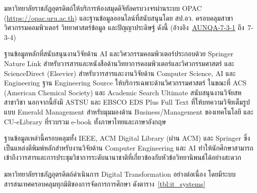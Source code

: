 มหาวิทยาลัยราชภัฏอุตรดิตถ์ให้บริการห้องสมุดดิจิทัลครบวงจรผ่านระบบ OPAC (\url{https://opac.uru.ac.th}) และฐานข้อมูลออนไลน์ที่สนับสนุนโดย สป.อว. ครอบคลุมสาขาวิศวกรรมคอมพิวเตอร์ วิทยาศาสตร์ข้อมูล และปัญญาประดิษฐ์ ดังนี้ (อ้างอิง~\hyperlink{ref:AUNQA-7-3-1}{AUNQA-7-3-1} ถึง~7-3-4)

ฐานข้อมูลหลักที่สนับสนุนงานวิจัยด้าน AI และวิศวกรรมคอมพิวเตอร์ประกอบด้วย Springer Nature Link สำหรับวารสารและหนังสือด้านวิทยาการคอมพิวเตอร์และวิศวกรรมศาสตร์ และ ScienceDirect (Elsevier) สำหรับวารสารและงานวิจัยด้าน Computer Science, AI และ Engineering ฐาน Engineering Source ให้บริการเฉพาะด้านวิศวกรรมศาสตร์ ในขณะที่ ACS (American Chemical Society) และ Academic Search Ultimate สนับสนุนงานวิจัยสหสาขาวิชา นอกจากนี้ยังมี ASTSU และ EBSCO EDS Plus Full Text ที่ให้บทความวิจัยเต็มรูปแบบ Emerald Management สำหรับมุมมองด้าน Business/Management ของเทคโนโลยี และ CU-eLibrary ที่รวบรวม e-book ทั้งภาษาไทยและภาษาอังกฤษ

ฐานข้อมูลเหล่านี้ครอบคลุมทั้ง IEEE, ACM Digital Library (ผ่าน ACM) และ Springer ซึ่งเป็นแหล่งตีพิมพ์หลักสำหรับงานวิจัยด้าน Computer Engineering และ AI ทำให้นักศึกษาสามารถเข้าถึงวารสารและการประชุมวิชาการระดับนานาชาติที่เกี่ยวข้องกับหัวข้อวิทยานิพนธ์ได้อย่างสะดวก


มหาวิทยาลัยราชภัฏอุตรดิตถ์ดำเนินการ Digital Transformation อย่างต่อเนื่อง โดยมีระบบสารสนเทศครอบคลุมทุกมิติของการจัดการการศึกษา ดังตาราง~\ref{tbl:it_systems}

